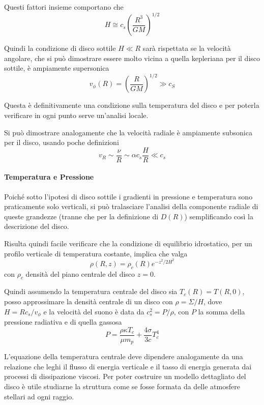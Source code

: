 \documentclass[a4paperbi]{article}
\begin{document}
	Questi fattori insieme comportano che
	\begin{equation}
		H\cong c_s\left(\frac{R^3}{GM}\right)^{1/2}
	\end{equation}

	Quindi la condizione di disco sottile $H\ll R$ sarà rispettata se la velocità angolare, che si può dimostrare essere molto vicina a quella kepleriana per il disco sottile, è ampiamente supersonica
	\begin{equation}
		v_\phi(R)=\left(\frac{R}{GM}\right)^{1/2}\gg c_S
	\end{equation}

	Questa è definitivamente una condizione sulla temperatura del disco e per poterla verificare in ogni punto serve un'analisi locale.
	
	Si può dimostrare analogamente che la velocità radiale è ampiamente subsonica per il disco, usando poche definizioni
	\begin{equation}
		v_R\sim\frac{\nu}{R}\sim\alpha c_s\frac{H}{R}\ll c_s
	\end{equation}
	
	\paragraph{Temperatura e Pressione} Poiché sotto l'ipotesi di disco sottile i gradienti in pressione e temperatura sono praticamente solo verticali, si può tralasciare l'analisi della componente radiale di queste grandezze (tranne che per la definizione di $D(R)$) semplificando così la descrizione del disco.
	
	Risulta quindi facile verificare che la condizione di equilibrio idrostatico, per un profilo verticale di temperatura costante, implica che valga
	\begin{equation*}
		\rho(R,z)=\rho_c(R)e^{-z^2/2H^2}
	\end{equation*}
	con $\rho_c$ densità del piano centrale del disco $z=0$.
	
	Quindi assumendo la temperatura centrale del disco sia $T_c(R)=T(R,0)$, posso approssimare la densità centrale di un disco con $\rho=\Sigma/H$, dove \\$H=Rc_s/v_\phi$ e la velocità del suono è data da $c_s^2=P/\rho$, con $P$ la somma della pressione radiativa e di quella gassosa
	\begin{equation}
		P=\frac{\rho\kappa T_c}{\mu m_p}+\frac{4\sigma}{3c}T_c^4
	\end{equation}
	
	L'equazione della temperatura centrale deve dipendere analogamente da una relazione che leghi il flusso di energia verticale e il tasso di energia generata dai processi di dissipazione viscosi. Per poter costruire un modello dettagliato del disco è utile studiarne la struttura come se fosse formata da delle atmosfere stellari ad ogni raggio. 
	
\end{document}
